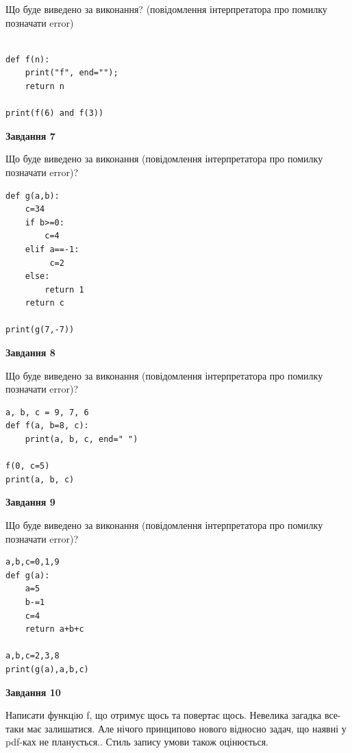 \documentclass[12pt, ukrainian]{article}
\begin{document}
{\begin {large}
Що буде виведено за виконання? (повідомлення інтерпретатора про помилку позначати error)\par
\begin{verbatim}

def f(n):
    print("f", end="");
    return n

print(f(6) and f(3))
\end{verbatim}

{\begin {center}\textbf{Завдання 7}\end {center}}

Що буде виведено за виконання (повідомлення інтерпретатора про помилку позначати error)?\par
\begin{verbatim}
def g(a,b):
    c=34
    if b>=0:
        c=4
    elif a==-1:
         c=2
    else: 
        return 1
    return c

print(g(7,-7))
\end{verbatim}

{\begin {center}\textbf{Завдання 8}\end {center}}

Що буде виведено за виконання (повідомлення інтерпретатора про помилку позначати error)?\par
\begin{verbatim}
a, b, c = 9, 7, 6
def f(a, b=8, c):
    print(a, b, c, end=" ")

f(0, c=5)
print(a, b, c)
\end{verbatim}

{\begin {center}\textbf{Завдання 9}\end {center}}

Що буде виведено за виконання (повідомлення інтерпретатора про помилку позначати error)?\par
\begin{verbatim}
a,b,c=0,1,9
def g(a):
    a=5
    b-=1
    c=4
    return a+b+c

a,b,c=2,3,8
print(g(a),a,b,c)
\end{verbatim}

{\begin {center}\textbf{Завдання 10}\end {center}}


Написати функцiю f, що отримує щось та повертає щось. Невелика загадка все-таки має залишатися. Але нічого принципово нового відносно задач, що наявні у pdf-ках не планується.. Стиль запису умови також оцінюється.\par
\end {large}}
\newpage
\end{document}
